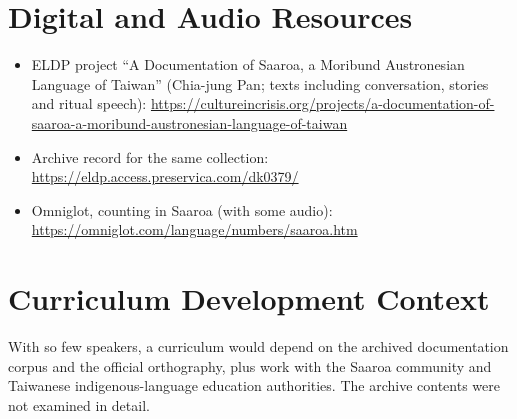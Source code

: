 \documentclass[12pt]{article}
\begin{document}
\section{Digital and Audio Resources}
\begin{itemize}
\item ELDP project ``A Documentation of Saaroa, a Moribund Austronesian Language of Taiwan'' (Chia-jung Pan; texts including conversation, stories and ritual speech): \url{https://cultureincrisis.org/projects/a-documentation-of-saaroa-a-moribund-austronesian-language-of-taiwan}
\item Archive record for the same collection: \url{https://eldp.access.preservica.com/dk0379/}
\item Omniglot, counting in Saaroa (with some audio): \url{https://omniglot.com/language/numbers/saaroa.htm}
\end{itemize}

\section{Curriculum Development Context}
With so few speakers, a curriculum would depend on the archived documentation corpus and the official orthography, plus work with the Saaroa community and Taiwanese indigenous-language education authorities. The archive contents were not examined in detail.
\end{document}
